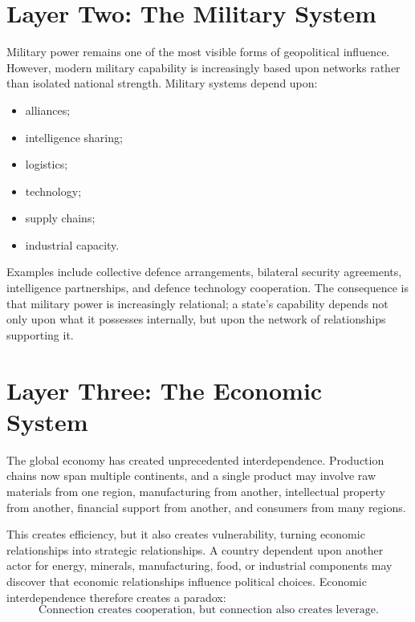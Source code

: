 \documentclass[11pt,openany]{book}
\theoremstyle{plain}
\theoremstyle{definition}
\begin{document}
\section*{Layer Two: The Military System}

Military power remains one of the most visible forms of geopolitical influence. However, modern military capability is increasingly based upon networks rather than isolated national strength. Military systems depend upon:
\begin{itemize}
\item alliances;
\item intelligence sharing;
\item logistics;
\item technology;
\item supply chains;
\item industrial capacity.
\end{itemize}

Examples include collective defence arrangements, bilateral security agreements, intelligence partnerships, and defence technology cooperation. The consequence is that military power is increasingly relational; a state's capability depends not only upon what it possesses internally, but upon the network of relationships supporting it.


\section*{Layer Three: The Economic System}

The global economy has created unprecedented interdependence. Production chains now span multiple continents, and a single product may involve raw materials from one region, manufacturing from another, intellectual property from another, financial support from another, and consumers from many regions.

This creates efficiency, but it also creates vulnerability, turning economic relationships into strategic relationships. A country dependent upon another actor for energy, minerals, manufacturing, food, or industrial components may discover that economic relationships influence political choices. Economic interdependence therefore creates a paradox:
\[
\boxed{
\text{Connection creates cooperation, but connection also creates leverage.}
}
\]

\end{document}
